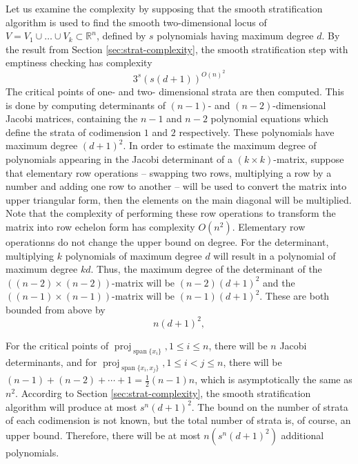 \documentclass[
]{book}
\theoremstyle{definition}
\theoremstyle{definition}
\theoremstyle{definition}
\theoremstyle{definition}
\theoremstyle{remark}
\begin{document}
Let us examine the complexity by supposing that the smooth stratification algorithm is used to find the smooth two-dimensional locus of \(V = V_1\cup \ldots \cup V_k \subset \mathbb{R}^n\), defined by \(s\) polynomials having maximum degree \(d\).
By the result from Section \ref{sec:strat-complexity}, the smooth stratification step with emptiness checking has complexity
\[
3^{s}\left(s(d+1)\right)^{O(n)^{2}}
\]
The critical points of one- and two- dimensional strata are then computed. This is done by computing determinants of \((n-1)\)- and \((n-2)\)-dimensional Jacobi matrices, containing the \(n-1\) and \(n-2\) polynomial equations which define the strata of codimension \(1\) and \(2\) respectively.
These polynomials have maximum degree \((d + 1)^{2}\).
In order to estimate the maximum degree of polynomials appearing in the Jacobi determinant of a \((k \times k)\)-matrix, suppose that elementary row operations -- swapping two rows, multiplying a row by a number and adding one row to another -- will be used to convert the matrix into upper triangular form, then the elements on the main diagonal will be multiplied. Note that the complexity of performing these row operations to transform the matrix into row echelon form has complexity \(O\left(n^2\right)\).
Elementary row operationns do not change the upper bound on degree. For the determinant, multiplying \(k\) polynomials of maximum degree \(d\) will result in a polynomial of maximum degree \(kd\). Thus, the maximum degree of the determinant of the \(((n-2)\times (n-2))\)-matrix will be \((n-2)(d + 1)^{2}\) and the \(((n-1) \times (n-1))\)-matrix will be \((n-1)(d + 1)^{2}\). These are both bounded from above by
\[
n (d + 1)^{2},
\]

For the critical points of \({\operatorname{proj}_{{\operatorname{span} \{x_i\}}}}, 1 \le i \le n\), there will be \(n\) Jacobi determinants, and for \({\operatorname{proj}_{{\operatorname{span} \{x_i,x_j\}}}}, 1 \le i < j \le n\), there will be \((n-1) + (n-2) + \cdots + 1 = \tfrac{1}{2} (n-1)n\), which is asymptotically the same as \(n^2\).
Accordirg to Section \ref{sec:strat-complexity}, the smooth stratification algorithm will produce at most \(s^n (d+1)^2\). The bound on the number of strata of each codimension is not known, but the total number of strata is, of course, an upper bound. Therefore, there will be at most \(n \left(s^n (d+1)^2\right)\) additional polynomials.
\end{document}
